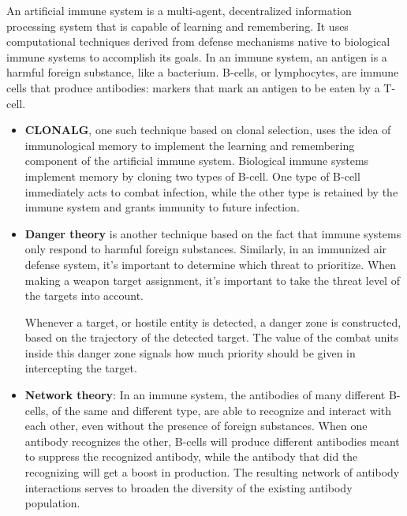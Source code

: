 \documentclass[12pt]{article} %
\begin{document}
    An artificial immune system is a multi-agent, decentralized information processing system that is capable of learning and remembering. It uses computational techniques derived from defense mechanisms native to biological immune systems to accomplish its goals. In an immune system, an antigen is a harmful foreign substance, like a bacterium. B-cells, or lymphocytes, are immune cells that produce antibodies: markers that mark an antigen to be eaten by a T-cell. 
    \begin{itemize}
        \item \textbf{CLONALG}, one such technique based on clonal selection, uses the idea of immunological memory to implement the learning and remembering component of the artificial immune system. Biological immune systems implement memory by cloning two types of B-cell. One type of B-cell immediately acts to combat infection, while the other type is retained by the immune system and grants immunity to future infection.
        
        \item \textbf{Danger theory} is another technique based on the fact that immune systems only respond to harmful foreign substances. Similarly, in an immunized air defense system, it's important to determine which threat to prioritize. When making a weapon target assignment, it's important to take the threat level of the targets into account. 

        Whenever a target, or hostile entity is detected, a danger zone is constructed, based on the trajectory of the detected target. The value of the combat units inside this danger zone signals how much priority should be given in intercepting the target.
        
        \item \textbf{Network theory}: In an immune system, the antibodies of many different B-cells, of the same and different type, are able to recognize and interact with each other, even without the presence of foreign substances. When one antibody recognizes the other, B-cells will produce different antibodies meant to suppress the recognized antibody, while the antibody that did the recognizing will get a boost in production. The resulting network of antibody interactions serves to broaden the diversity of the existing antibody population. 

    \end{itemize}   
    
\end{document}
